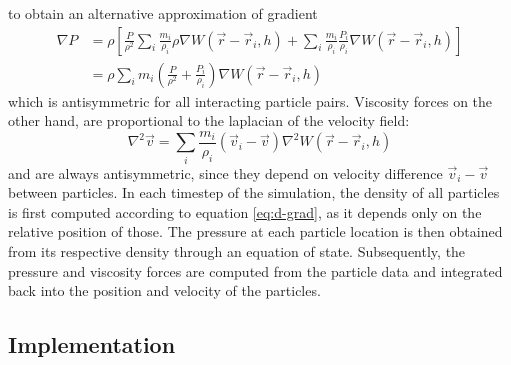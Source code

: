 \documentclass{llncs}
\begin{document}
to obtain an alternative approximation of gradient
\begin{align}
  \label{eq:grad-est}
  \nabla P & = \rho \left[ \frac{P}{\rho^2} \sum_i \frac{m_i}{\rho_i} \rho \nabla
             W(\vec{r}-\vec{r}_i, h)
             +
             \sum_i \frac{m_i}{\rho_i} \frac{P_i}{\rho_i} \nabla W(\vec{r}-\vec{r}_i, h)
             \right] \nonumber \\
           & = \rho \sum_i m_i \left(\frac{P}{\rho^2} + \frac{P_i}{\rho_i} \right)
             \nabla W(\vec{r}-\vec{r}_i, h)
\end{align}
which is antisymmetric for all interacting particle pairs. Viscosity forces on the other
hand, are proportional to the laplacian of the velocity field:
\begin{equation}
  \label{eq:lapl-est}
  \nabla^2\vec{v} = \sum_i \frac{m_i}{\rho_i} (\vec{v}_i - \vec{v}) \nabla^2
  W(\vec{r}-\vec{r}_i, h)
\end{equation}
and are always antisymmetric, since they depend on velocity difference
$\vec{v}_i - \vec{v}$ between particles.  In each timestep of the simulation, the density
of all particles is first computed according to equation \ref{eq:d-grad}, as it depends
only on the relative position of those. The pressure at each particle location is then
obtained from its respective density through an equation of state. Subsequently, the
pressure and viscosity forces are computed from the particle data and integrated back into
the position and velocity of the particles.

\subsection{Implementation}
\end{document}
